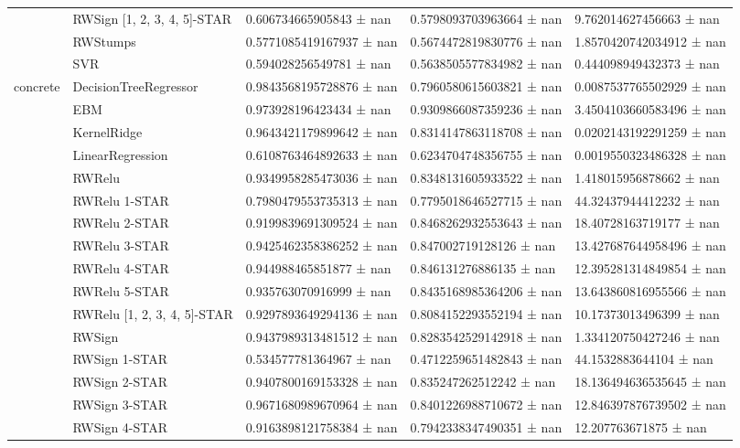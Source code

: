 \begin{tabular}{lllll}
 & RWSign [1, 2, 3, 4, 5]-STAR & 0.606734665905843 ± nan & 0.5798093703963664 ± nan & 9.762014627456663 ± nan \\
 & RWStumps & 0.5771085419167937 ± nan & 0.5674472819830776 ± nan & 1.8570420742034912 ± nan \\
 & SVR & 0.594028256549781 ± nan & 0.5638505577834982 ± nan & 0.444098949432373 ± nan \\
\cline{1-5}
\multirow[t]{20}{*}{concrete} & DecisionTreeRegressor & 0.9843568195728876 ± nan & 0.7960580615603821 ± nan & 0.0087537765502929 ± nan \\
 & EBM & 0.973928196423434 ± nan & 0.9309866087359236 ± nan & 3.4504103660583496 ± nan \\
 & KernelRidge & 0.9643421179899642 ± nan & 0.8314147863118708 ± nan & 0.0202143192291259 ± nan \\
 & LinearRegression & 0.6108763464892633 ± nan & 0.6234704748356755 ± nan & 0.0019550323486328 ± nan \\
 & RWRelu & 0.9349958285473036 ± nan & 0.8348131605933522 ± nan & 1.418015956878662 ± nan \\
 & RWRelu 1-STAR & 0.7980479553735313 ± nan & 0.7795018646527715 ± nan & 44.32437944412232 ± nan \\
 & RWRelu 2-STAR & 0.9199839691309524 ± nan & 0.8468262932553643 ± nan & 18.40728163719177 ± nan \\
 & RWRelu 3-STAR & 0.9425462358386252 ± nan & 0.847002719128126 ± nan & 13.427687644958496 ± nan \\
 & RWRelu 4-STAR & 0.944988465851877 ± nan & 0.846131276886135 ± nan & 12.395281314849854 ± nan \\
 & RWRelu 5-STAR & 0.935763070916999 ± nan & 0.8435168985364206 ± nan & 13.643860816955566 ± nan \\
 & RWRelu [1, 2, 3, 4, 5]-STAR & 0.9297893649294136 ± nan & 0.8084152293552194 ± nan & 10.17373013496399 ± nan \\
 & RWSign & 0.9437989313481512 ± nan & 0.8283542529142918 ± nan & 1.334120750427246 ± nan \\
 & RWSign 1-STAR & 0.534577781364967 ± nan & 0.4712259651482843 ± nan & 44.1532883644104 ± nan \\
 & RWSign 2-STAR & 0.9407800169153328 ± nan & 0.835247262512242 ± nan & 18.136494636535645 ± nan \\
 & RWSign 3-STAR & 0.9671680989670964 ± nan & 0.8401226988710672 ± nan & 12.846397876739502 ± nan \\
 & RWSign 4-STAR & 0.9163898121758384 ± nan & 0.7942338347490351 ± nan & 12.207763671875 ± nan \\

\end{tabular}
